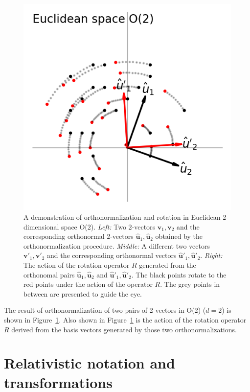 \documentclass{article}
\newcommand{\Evec}[1]{{\mathbf{#1}}} %
\newcommand{\Ehat}[1]{{\mathbf{\hat{#1}}}} %
\newcommand{\figref}[1]{Figure~\ref{#1}}
\newlength{\figurewidth}
\begin{document}
\begin{figure}[t]
\begin{mdframed}
\includegraphics[width=\figurewidth]{E_Q.png}
\caption{A demonstration of orthonormalization and rotation in Euclidean 2-dimensional space O($2$).
    \textsl{Left:} Two 2-vectors $\Evec{v}_1, \Evec{v}_2$ and the corresponding orthonormal 2-vectors $\Ehat{u}_1, \Ehat{u}_2$ obtained by the orthonormalization procedure.
\textsl{Middle:} A different two vectors $\Evec{v}'_1, \Evec{v}'_2$ and the corresponding orthonormal vectors $\Ehat{u}'_1, \Ehat{u}'_2$.
\textsl{Right:} The action of the rotation operator $R$ generated from the orthonomal pairs $\Ehat{u}_1, \Ehat{u}_2$ and $\Ehat{u}'_1, \Ehat{u}'_2$.
The black points rotate to the red points under the action of the operator $R$.
The grey points in between are presented to guide the eye.\label{fig:Euclid}}
\end{mdframed}
\end{figure}
The result of orthonormalization of two pairs of 2-vectors in O($2$) ($d=2$) is shown in \figref{fig:Euclid}.
Also shown in \figref{fig:Euclid} is the action of the rotation operator $R$ derived from the basis vectors generated by those two orthonormalizations.

\section{Relativistic notation and transformations}\label{sec:notation}
\end{document}

